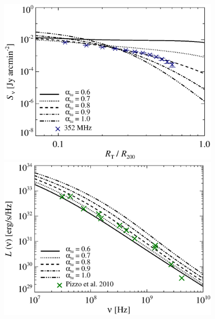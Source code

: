 \documentclass[fleqn,usenatbib,useAMS]{mnras}
\newcommand{\Mflatturb}{{\it M-turbulence}\xspace}
\begin{document}
\begin{figure}
\\
\begin{minipage}{1\columnwidth}
  \begin{center}%
    \includegraphics[width=\columnwidth]{prof.comp.KrTTDth.aI0.eps}
  \end{center}
\end{minipage}
\begin{minipage}{1\columnwidth}
   \begin{center}%
     \includegraphics[width=\columnwidth]{spec.comp.KrTTDth.aI0.eps}
   \end{center}
\end{minipage}

\end{figure}
\end{document}
